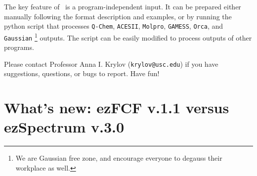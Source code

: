 \documentclass[11pt]{article}
\begin{document}
The key feature of \ezFCF\ is a program-independent \xml input. 
It can be prepared either manually following the format description and examples, 
or by running the python script that processes 
{\tt Q-Chem}, {\tt ACESII}, {\tt Molpro}, {\tt GAMESS}, {\tt Orca}, and {\tt Gaussian}
\footnote{We are Gaussian free zone, and encourage everyone to degauss their workplace as well.} outputs.
The script can be easily modified to process outputs of other programs. 
 
Please contact Professor Anna I. Krylov ({\tt krylov@usc.edu})
if you have suggestions, questions, or bugs to report. Have fun!  

\section*{What's new: ezFCF v.1.1 versus ezSpectrum v.3.0}
\end{document}
